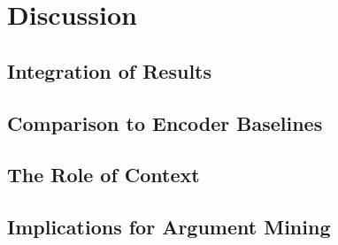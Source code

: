 
\chapter{Discussion}
\label{ch:discussion}

\section{Integration of Results}
\label{sec:integration}


\section{Comparison to Encoder Baselines}
\label{sec:encoder_comparison}


\section{The Role of Context}
\label{sec:role_of_context}


\section{Implications for Argument Mining}
\label{sec:implications}


